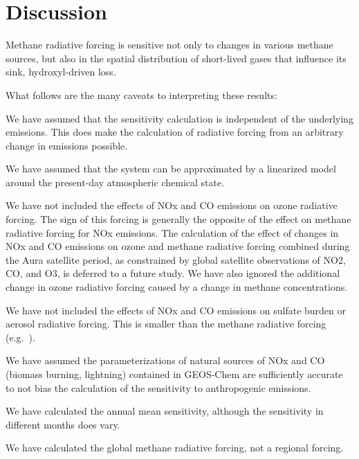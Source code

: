 \section{Discussion}

Methane radiative forcing is sensitive not only to changes in various methane sources, but also in the spatial distribution of short-lived gases that influence its sink, hydroxyl-driven loss.

What follows are the many caveats to interpreting these results:

We have assumed that the sensitivity calculation is independent of the underlying emissions. This does make the calculation of radiative forcing from an arbitrary change in emissions possible.

We have assumed that the system can be approximated by a linearized model around the present-day atmospheric chemical state.

We have not included the effects of NOx and CO emissions on ozone radiative forcing. The sign of this forcing is generally the opposite of the effect on methane radiative forcing for NOx emissions. The calculation of the effect of changes in NOx and CO emissions on ozone and methane radiative forcing combined during the Aura satellite period, as constrained by global satellite observations of NO2, CO, and O3, is deferred to a future study. We have also ignored the additional change in ozone radiative forcing caused by a change in methane concentrations.

We have not included the effects of NOx and CO emissions on sulfate burden or aerosol radiative forcing. This is smaller than the methane radiative forcing (e.g.~\citet{ref:fry2012}).

We have assumed the parameterizations of natural sources of NOx and CO (biomass burning, lightning) contained in GEOS-Chem are sufficiently accurate to not bias the calculation of the sensitivity to anthropogenic emissions.

We have calculated the annual mean sensitivity, although the sensitivity in different months does vary.

We have calculated the global methane radiative forcing, not a regional forcing.
